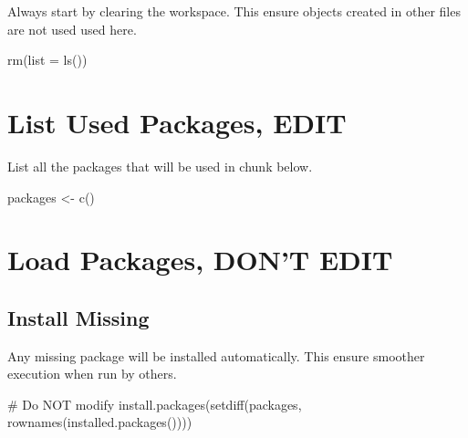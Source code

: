 \documentclass[
  letterpaper,
  DIV=11,
  numbers=noendperiod]{scrreprt}
\newenvironment{Shaded}{\begin{snugshade}}{\end{snugshade}}
\newcommand{\AttributeTok}[1]{\textcolor[rgb]{0.40,0.45,0.13}{#1}}
\newcommand{\CommentTok}[1]{\textcolor[rgb]{0.37,0.37,0.37}{#1}}
\newcommand{\FunctionTok}[1]{\textcolor[rgb]{0.28,0.35,0.67}{#1}}
\newcommand{\NormalTok}[1]{\textcolor[rgb]{0.00,0.23,0.31}{#1}}
\newcommand{\OtherTok}[1]{\textcolor[rgb]{0.00,0.23,0.31}{#1}}
\begin{document}
Always start by clearing the workspace. This ensure objects created in
other files are not used used here.

\begin{Shaded}
\begin{Highlighting}[]
\FunctionTok{rm}\NormalTok{(}\AttributeTok{list =} \FunctionTok{ls}\NormalTok{())}
\end{Highlighting}
\end{Shaded}

\section*{List Used Packages, EDIT}\label{list-used-packages-edit-1}


List all the packages that will be used in chunk below.

\begin{Shaded}
\begin{Highlighting}[]
\NormalTok{packages }\OtherTok{\textless{}{-}} \FunctionTok{c}\NormalTok{()}
\end{Highlighting}
\end{Shaded}

\section*{Load Packages, DON'T EDIT}\label{sec-packages}


\subsection*{Install Missing}\label{install-missing-1}

Any missing package will be installed automatically. This ensure
smoother execution when run by others.

\begin{Shaded}
\begin{Highlighting}[]
\CommentTok{\# Do NOT modify}
\FunctionTok{install.packages}\NormalTok{(}\FunctionTok{setdiff}\NormalTok{(packages, }\FunctionTok{rownames}\NormalTok{(}\FunctionTok{installed.packages}\NormalTok{())))}
\end{Highlighting}
\end{Shaded}
\end{document}
